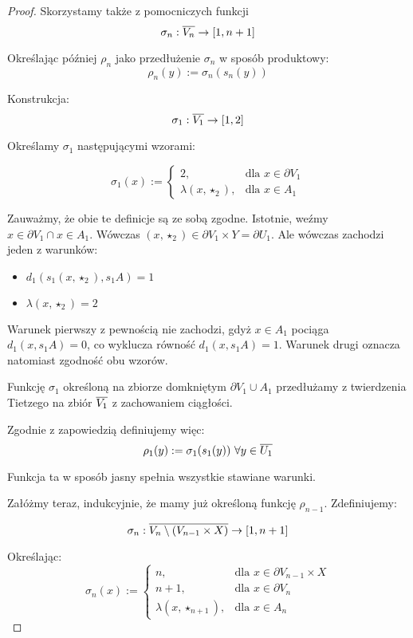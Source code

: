 \begin{thm}
\begin{proof}
  Skorzystamy także z pomocniczych funkcji
  $$\sigma_n: \overline{V_n} \rightarrow [1,n+1]$$
  
  Określając później $\rho_n$ jako przedłużenie $\sigma_n$ w sposób produktowy:
  $$\rho_n(y) := \sigma_n(s_n(y))$$

  Konstrukcja:
  $$\sigma_1: \overline{V_1} \rightarrow [1,2]$$
  
  Określamy $\sigma_1$ następującymi wzorami:
  
  $$
  \sigma_1(x) := 
    \begin{cases}
      2,&\mbox{dla }x \in \partial V_1 \\
      \lambda(x, \star_2),& \mbox{dla }x \in A_1 
    \end{cases}
  $$
  
  Zauważmy, że obie te definicje są ze sobą zgodne. Istotnie, weźmy $x \in \partial V_1 \cap x \in A_1$. Wówczas $(x, \star_2) \in \partial V_1 \times Y = \partial U_1$. Ale wówczas zachodzi jeden z warunków:
  
  \begin{itemize}
    \item $d_1(s_1 (x, \star_2), s_1 A) = 1$
    \item $\lambda(x, \star_2) = 2$
  \end{itemize}

  Warunek pierwszy z pewnością nie zachodzi, gdyż $x \in A_1$ pociąga $d_1(x, s_1 A) = 0$, co wyklucza równość $d_1(x, s_1 A) = 1$.
  Warunek drugi oznacza natomiast zgodność obu wzorów.
  
  Funkcję $\sigma_1$ określoną na zbiorze domkniętym $\partial V_1 \cup A_1$ przedłużamy z twierdzenia Tietzego na zbiór $\overline{V_1}$ z zachowaniem ciągłości.
  
  Zgodnie z zapowiedzią definiujemy więc:
  $$\rho_1(y) := \sigma_1(s_1(y))\ \forall y \in \overline{U_1}$$
  
  Funkcja ta w sposób jasny spełnia wszystkie stawiane warunki.
  
  Załóżmy teraz, indukcyjnie, że mamy już określoną funkcję $\rho_{n-1}$. Zdefiniujemy:
  
  $$\sigma_n: \overline{V_n \setminus (V_{n-1} \times X)} \rightarrow [1,n+1]$$
  
  Określając:
  $$
  \sigma_n(x) := 
    \begin{cases}
      n,&\mbox{dla }x \in \partial V_{n-1} \times X \\
      n+1,&\mbox{dla }x \in \partial V_n \\
      \lambda(x, \star_{n+1}),&\mbox{dla }x \in A_n
    \end{cases}
  $$


\end{proof}
\end{thm}
